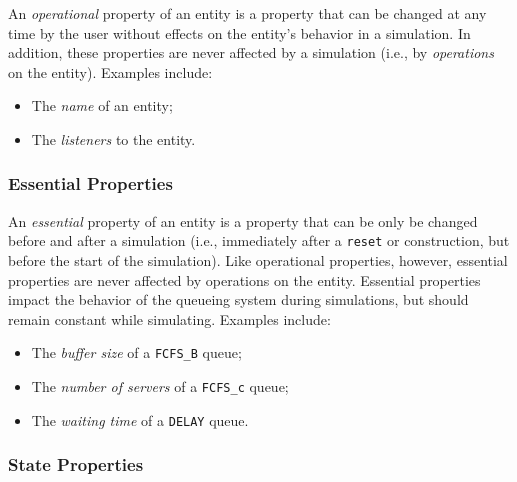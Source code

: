 \documentclass[12pt]{book}
\begin{document}
An {\em operational\/} property of an entity is a property that can be changed at any time
  by the user without effects on the entity's behavior in a simulation.
In addition, these properties are never affected by a simulation
  (i.e., by {\em operations\/} on the entity).
Examples include:
\begin{itemize}
\item The {\em name\/} of an entity;
\item The {\em listeners\/} to the entity.
\end{itemize}

\subsubsection{Essential Properties}

An {\em essential\/} property of an entity is a property
  that can be only be changed before and after a simulation
  (i.e., immediately after a \lstinline-reset- or construction,
  but before the start of the simulation).
Like operational properties, however, essential properties are never affected
  by operations on the entity.
Essential properties impact the behavior of the queueing system during simulations,
  but should remain constant while simulating.
Examples include:
\begin{itemize}
\item The {\em buffer size\/} of a \lstinline-FCFS_B- queue;
\item The {\em number of servers\/} of a \lstinline-FCFS_c- queue;
\item The {\em waiting time\/} of a \lstinline-DELAY- queue.
\end{itemize}

\subsubsection{State Properties}
\end{document}
